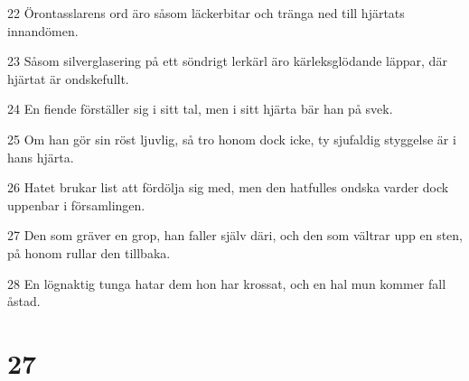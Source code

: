 \par 22 Örontasslarens ord äro såsom läckerbitar och tränga ned till hjärtats innandömen.
\par 23 Såsom silverglasering på ett söndrigt lerkärl äro kärleksglödande läppar, där hjärtat är ondskefullt.
\par 24 En fiende förställer sig i sitt tal, men i sitt hjärta bär han på svek.
\par 25 Om han gör sin röst ljuvlig, så tro honom dock icke, ty sjufaldig styggelse är i hans hjärta.
\par 26 Hatet brukar list att fördölja sig med, men den hatfulles ondska varder dock uppenbar i församlingen.
\par 27 Den som gräver en grop, han faller själv däri, och den som vältrar upp en sten, på honom rullar den tillbaka.
\par 28 En lögnaktig tunga hatar dem hon har krossat, och en hal mun kommer fall åstad.

\chapter{27}

